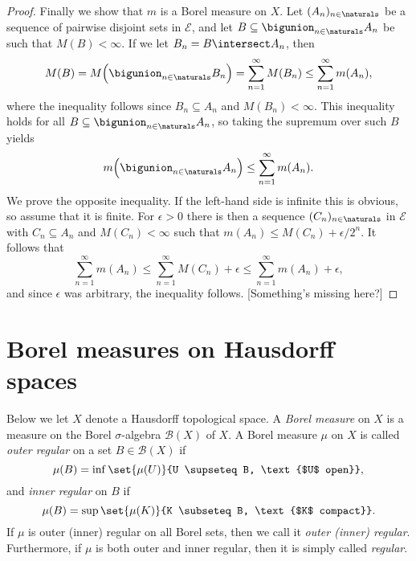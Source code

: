 \documentclass[article, a4paper, 11pt, oneside]{memoir}
\numberwithin{equation}{chapter}
\newcommand{\calB}{\mathcal{B}}
\newcommand{\calE}{\mathcal{E}}
\newcommand{\borel}[1]{\calB(#1)}
\begin{document}
\begin{proof}
    Finally we show that $m$ is a Borel measure on $X$. Let $(A_n)_{n \in \naturals}$ be a sequence of pairwise disjoint sets in $\calE$, and let $B \subseteq \bigunion_{n \in \naturals} A_n$ be such that $M(B) < \infty$. If we let $B_n = B \intersect A_n$, then
    \begin{equation*}
        M(B)
            = M \Bigl( \bigunion_{n \in \naturals} B_n \Bigr)
            = \sum_{n=1}^\infty M(B_n)
            \leq \sum_{n=1}^\infty m(A_n),
    \end{equation*}
    where the inequality follows since $B_n \subseteq A_n$ and $M(B_n) < \infty$. This inequality holds for all $B \subseteq \bigunion_{n \in \naturals} A_n$, so taking the supremum over such $B$ yields
    \begin{equation*}
        m \Bigl( \bigunion_{n \in \naturals} A_n \Bigr)
            \leq \sum_{n=1}^\infty m(A_n).
    \end{equation*}
    We prove the opposite inequality. If the left-hand side is infinite this is obvious, so assume that it is finite. For $\epsilon > 0$ there is then a sequence $(C_n)_{n \in \naturals}$ in $\calE$ with $C_n \subseteq A_n$ and $M(C_n) < \infty$ such that $m(A_n) \leq M(C_n) + \epsilon/2^n$. It follows that
    \begin{equation*}
        \sum_{n=1}^\infty m(A_n)
            \leq \sum_{n=1}^\infty M(C_n) + \epsilon
            \leq \sum_{n=1}^\infty m(A_n) + \epsilon,
    \end{equation*}
    and since $\epsilon$ was arbitrary, the inequality follows. [Something's missing here?]
\end{proof}


\section{Borel measures on Hausdorff spaces}

Below we let $X$ denote a Hausdorff topological space. A \emph{Borel measure} on $X$ is a measure on the Borel $\sigma$-algebra $\borel{X}$ of $X$. A Borel measure $\mu$ on $X$ is called \emph{outer regular} on a set $B \in \borel{X}$ if
%
\begin{equation*}
    \mu(B)
        = \inf \set{\mu(U)}{U \supseteq B, \text{$U$ open}},
\end{equation*}
%
and \emph{inner regular} on $B$ if
%
\begin{equation*}
    \mu(B)
        = \sup \set{\mu(K)}{K \subseteq B, \text{$K$ compact}}.
\end{equation*}
%
If $\mu$ is outer (inner) regular on all Borel sets, then we call it \emph{outer (inner) regular}. Furthermore, if $\mu$ is both outer and inner regular, then it is simply called \emph{regular}.
\end{document}
